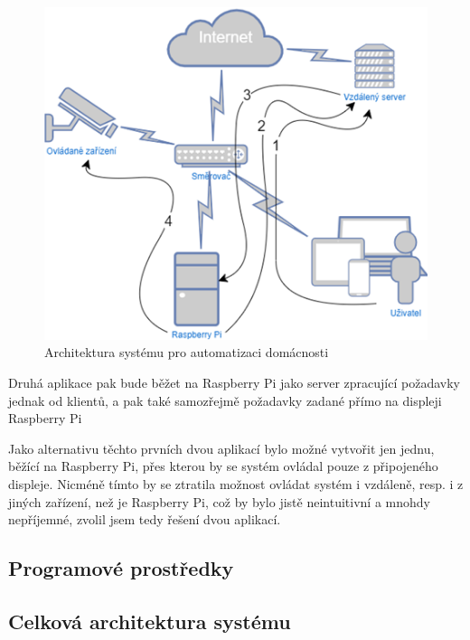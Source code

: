 \begin{figure}[!hbt]
	\centering
	\includegraphics[scale=0.7]{obrazky/architektura.png}
	\caption{Architektura systému pro automatizaci domácnosti}
	\label{architektura}
\end{figure}

Druhá aplikace pak bude běžet na Raspberry Pi jako server zpracující požadavky jednak od klientů, a pak také samozřejmě požadavky zadané přímo na displeji Raspberry Pi 


Jako alternativu těchto prvních dvou aplikací bylo možné vytvořit jen jednu, běžící na Raspberry Pi, přes kterou by se systém ovládal pouze z připojeného displeje. Nicméně tímto by se ztratila možnost ovládat systém i vzdáleně, resp. i z jiných zařízení, než je Raspberry Pi, což by bylo jistě neintuitivní a mnohdy nepříjemné, zvolil jsem tedy řešení dvou aplikací.

\subsection*{Programové prostředky}

\subsection*{Celková architektura systému}

